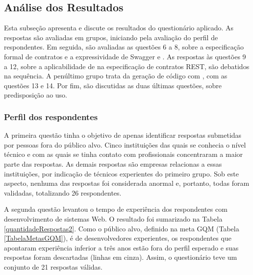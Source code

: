 \subsection{Análise dos Resultados}
\label{AnaliseQuestionario}
\vspace{-6mm}

Esta subseção apresenta e discute os resultados do questionário aplicado. As
respostas são avaliadas em grupos, iniciando pela avaliação do perfil de
respondentes. Em seguida, são avaliadas as questões 6 a 8, sobre a especificação
formal de contratos e a expressividade de Swagger e \neoidl{}. As respostas às
questões 9 a 12, sobre a aplicabilidade de \designbycontract{} na especificação
 de contratos REST, são debatidos na sequência. A penúltimo grupo trata da
 geração de código com \designbycontract{}, com as questões 13 e 14. Por fim,
 são discutidas as duas últimas questões, sobre predisposição ao uso.

\subsubsection{Perfil dos respondentes}

A primeira questão tinha o objetivo de apenas identificar respostas
submetidas por pessoas fora do público alvo. Cinco instituições das quais se
conhecia o nível técnico e com as quais se tinha contato com profissionais
concentraram a maior parte das respostas. As demais respostas são empresas
relacionas a essas instituições, por indicação de técnicos experientes
do primeiro grupo. Sob este aspecto, nenhuma das respostas foi considerada
anormal e, portanto, todas foram validadas, totalizando 26 respondentes.

A segunda questão levantou o tempo de experiência dos respondentes com
desenvolvimento de sistemas Web. O resultado foi sumarizado na Tabela
\ref{quantidadeRespostas2}. Como o público alvo, definido na meta GQM (Tabela
\ref{TabelaMetasGQM}), é de desenvolvedores experientes, os respondentes que
apontaram experiência inferior a três anos estão fora do perfil esperado e suas
respostas foram descartadas (linhas em cinza). Assim, o questionário teve um
conjunto de 21 respostas válidas.

